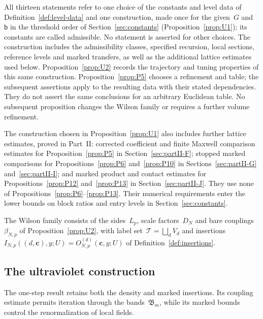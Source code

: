 All thirteen statements refer to one choice of the constants and level data of Definition~\ref{def:level-data} and one construction, made once for the given~$G$ and~$\mathsf b$ in the threshold order of Section~\ref{sec:constants} (Proposition~\ref{prop:U1}); its constants are called admissible. No statement is asserted for other choices. The construction includes the admissibility classes, specified recursion, local sections, reference levels and marked transfers, as well as the additional lattice estimates used below. Proposition~\ref{prop:U2} records the trajectory and tuning properties of this same construction. Proposition~\ref{prop:P5} chooses a refinement and table; the subsequent assertions apply to the resulting data with their stated dependencies. They do not assert the same conclusions for an arbitrary Euclidean table. No subsequent proposition changes the Wilson family or requires a further volume refinement.

The construction chosen in Proposition~\ref{prop:U1} also includes further lattice estimates, proved in Part~II: corrected coefficient and finite Maxwell comparison estimates for Proposition~\ref{prop:P5} in Section~\ref{sec:partII-F}; stopped marked comparisons for Propositions~\ref{prop:P6} and~\ref{prop:P10} in Sections~\ref{sec:partII-G} and~\ref{sec:partII-I}; and marked product and contact estimates for Propositions~\ref{prop:P12} and~\ref{prop:P13} in Section~\ref{sec:partII-J}. They use none of Propositions~\ref{prop:P6}--\ref{prop:P13}. Their numerical requirements enter the lower bounds on block ratios and entry levels in Section~\ref{sec:constants}.

The Wilson family consists of the sides~$L_p$, scale factors~$D_N$ and bare couplings~$\beta_{N,p}$ of Proposition~\ref{prop:U2}, with label set~$\mathcal T=\bigsqcup_d V_d$ and insertions~$I_{N,p}((d,\mathbf c),y;U)=O^{(d)}_{N,p}(\mathbf c,y;U)$ of Definition~\ref{def:insertions}.

\subsection{The ultraviolet construction}

The one-step result retains both the density and marked insertions. Its coupling
estimate permits iteration through the bands~$\mathfrak B_m$, while its marked
bounds control the renormalization of local fields.

